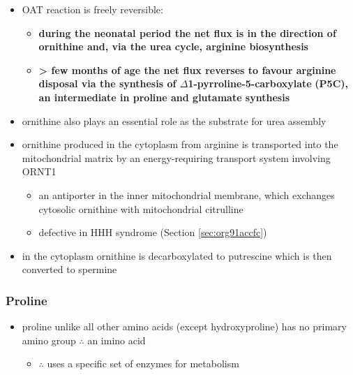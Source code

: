 \documentclass[12pt]{scrartcl}
\begin{document}
\begin{center}
\begin{center}
\begin{itemize}
\item OAT reaction is freely reversible:
\begin{itemize}
\item \textbf{during the neonatal period the net flux is in the direction of}
\textbf{ornithine and, via the urea cycle, arginine biosynthesis}
\item \textbf{\textgreater{} few months of age the net flux reverses to favour arginine}
\textbf{disposal via the synthesis of \(\Delta\)1-pyrroline-5-carboxylate}
\textbf{(P5C), an intermediate in proline and glutamate synthesis}
\end{itemize}
\item ornithine also plays an essential role as the substrate for urea assembly
\item ornithine produced in the cytoplasm from arginine is transported
into the mitochondrial matrix by an energy-requiring transport
system involving ORNT1
\begin{itemize}
\item an antiporter in the inner mitochondrial membrane, which exchanges
cytosolic ornithine with mitochondrial citrulline
\item defective in HHH syndrome (Section \ref{sec:org91accfc})
\end{itemize}
\item in the cytoplasm ornithine is decarboxylated to putrescine which is
then converted to spermine
\end{itemize}

\subsubsection{Proline}
\label{sec:org7f9e64f}
\begin{itemize}
\item proline unlike all other amino acids (except hydroxyproline) has
no primary amino group \(\therefore\) an imino acid
\begin{itemize}
\item \(\therefore\) uses a specific set of enzymes for metabolism
\end{itemize}
\end{itemize}

\begin{center}
\chemnameinit{}
\end{center}


\end{center}
\end{center}
\end{document}
